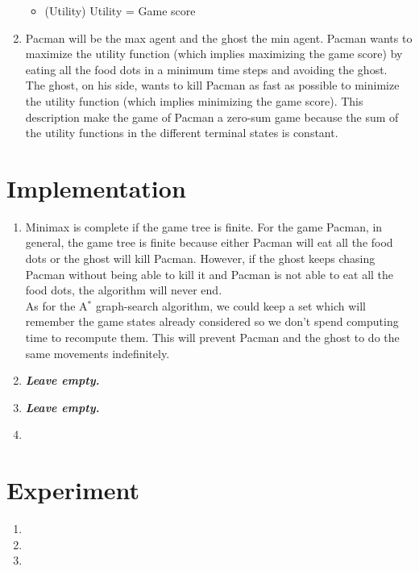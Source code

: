 \documentclass{article}
\begin{document}
\begin{enumerate}[label=\alph*.,leftmargin=*]
\begin{itemize}
			\item (Utility) Utility = Game score
    	\end{itemize}
    	
    \item Pacman will be the max agent and the ghost the min agent. Pacman wants to maximize the utility function (which implies maximizing the game score) by eating all the food dots in a minimum time steps and avoiding the ghost.\\
          The ghost, on his side, wants to kill Pacman as fast as possible to minimize the utility function (which implies minimizing the game score). This description make the game of Pacman a zero-sum game because the sum of the utility functions in the different terminal states is constant.
\end{enumerate}

\section{Implementation}

\begin{enumerate}[label=\alph*.,leftmargin=*]
    \item Minimax is complete if the game tree is finite. For the game Pacman, in general, the game tree is finite because either Pacman will eat all the food dots or the ghost will kill Pacman. However, if the ghost keeps chasing Pacman without being able to kill it and Pacman is not able to eat all the food dots, the algorithm will never end.\\
    As for the A$^*$ graph-search algorithm, we could keep a set which will remember the game states already considered so we don't spend computing time to recompute them. This will prevent Pacman and the ghost to do the same movements indefinitely.
    \item \textbf{\textit{Leave empty.}}
    \item \textbf{\textit{Leave empty.}}
    \item
\end{enumerate}

\section{Experiment}

\begin{enumerate}[label=\alph*.,leftmargin=*]
    \item
    \item
    \item
\end{enumerate}



\end{document}
